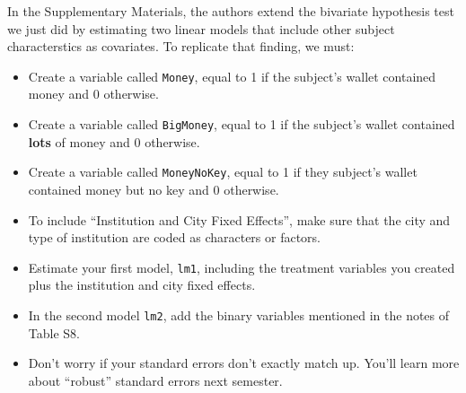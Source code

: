 \documentclass[12pt,halfline,a4paper,]{ouparticle}
\providecommand{\tightlist}{%
  \setlength{\itemsep}{0pt}\setlength{\parskip}{0pt}}
\begin{document}
In the Supplementary Materials, the authors extend the bivariate
hypothesis test we just did by estimating two linear models that include
other subject characterstics as covariates. To replicate that finding,
we must:

\begin{itemize}
\tightlist
\item
  Create a variable called \texttt{Money}, equal to 1 if the subject's
  wallet contained money and 0 otherwise.
\item
  Create a variable called \texttt{BigMoney}, equal to 1 if the
  subject's wallet contained \textbf{lots} of money and 0 otherwise.
\item
  Create a variable called \texttt{MoneyNoKey}, equal to 1 if they
  subject's wallet contained money but no key and 0 otherwise.
\item
  To include ``Institution and City Fixed Effects'', make sure that the
  city and type of institution are coded as characters or factors.
\item
  Estimate your first model, \texttt{lm1}, including the treatment
  variables you created plus the institution and city fixed effects.
\item
  In the second model \texttt{lm2}, add the binary variables mentioned
  in the notes of Table S8.
\item
  Don't worry if your standard errors don't exactly match up. You'll
  learn more about ``robust'' standard errors next semester.
\end{itemize}
\end{document}
